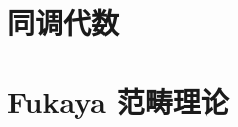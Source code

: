 \documentclass[10pt,a4paper]{article}
\theoremstyle{definition}
\begin{document}


\clearpage
{}
\pagestyle{fancy}

\clearpage
\part{同调代数}
\clearpage






\clearpage
\part{Fukaya 范畴理论}
\clearpage









\end{document}
